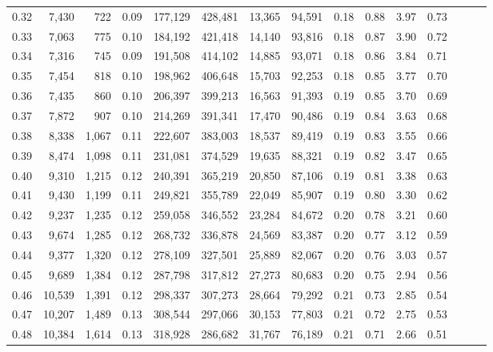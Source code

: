 \begin{tabular}{rrrrrrrrrrrrrrr}
0.32 &   7,430 &    722 &  0.09 &  177,129 &  428,481 &   13,365 &   94,591 &  0.18 &  0.88 &  3.97 &      0.73 \\
0.33 &   7,063 &    775 &  0.10 &  184,192 &  421,418 &   14,140 &   93,816 &  0.18 &  0.87 &  3.90 &      0.72 \\
0.34 &   7,316 &    745 &  0.09 &  191,508 &  414,102 &   14,885 &   93,071 &  0.18 &  0.86 &  3.84 &      0.71 \\
0.35 &   7,454 &    818 &  0.10 &  198,962 &  406,648 &   15,703 &   92,253 &  0.18 &  0.85 &  3.77 &      0.70 \\
0.36 &   7,435 &    860 &  0.10 &  206,397 &  399,213 &   16,563 &   91,393 &  0.19 &  0.85 &  3.70 &      0.69 \\
0.37 &   7,872 &    907 &  0.10 &  214,269 &  391,341 &   17,470 &   90,486 &  0.19 &  0.84 &  3.63 &      0.68 \\
0.38 &   8,338 &  1,067 &  0.11 &  222,607 &  383,003 &   18,537 &   89,419 &  0.19 &  0.83 &  3.55 &      0.66 \\
0.39 &   8,474 &  1,098 &  0.11 &  231,081 &  374,529 &   19,635 &   88,321 &  0.19 &  0.82 &  3.47 &      0.65 \\
0.40 &   9,310 &  1,215 &  0.12 &  240,391 &  365,219 &   20,850 &   87,106 &  0.19 &  0.81 &  3.38 &      0.63 \\
0.41 &   9,430 &  1,199 &  0.11 &  249,821 &  355,789 &   22,049 &   85,907 &  0.19 &  0.80 &  3.30 &      0.62 \\
0.42 &   9,237 &  1,235 &  0.12 &  259,058 &  346,552 &   23,284 &   84,672 &  0.20 &  0.78 &  3.21 &      0.60 \\
0.43 &   9,674 &  1,285 &  0.12 &  268,732 &  336,878 &   24,569 &   83,387 &  0.20 &  0.77 &  3.12 &      0.59 \\
0.44 &   9,377 &  1,320 &  0.12 &  278,109 &  327,501 &   25,889 &   82,067 &  0.20 &  0.76 &  3.03 &      0.57 \\
0.45 &   9,689 &  1,384 &  0.12 &  287,798 &  317,812 &   27,273 &   80,683 &  0.20 &  0.75 &  2.94 &      0.56 \\
0.46 &  10,539 &  1,391 &  0.12 &  298,337 &  307,273 &   28,664 &   79,292 &  0.21 &  0.73 &  2.85 &      0.54 \\
0.47 &  10,207 &  1,489 &  0.13 &  308,544 &  297,066 &   30,153 &   77,803 &  0.21 &  0.72 &  2.75 &      0.53 \\
0.48 &  10,384 &  1,614 &  0.13 &  318,928 &  286,682 &   31,767 &   76,189 &  0.21 &  0.71 &  2.66 &      0.51 \\

\end{tabular}
